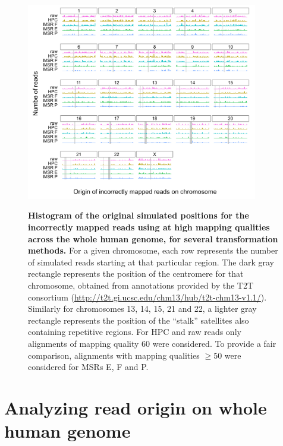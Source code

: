\documentclass[
  11pt,
  twoside]{scrbook}
\newcommand{\extcaption}[2]{
    \caption[#1]{
        \textbf{#1}\newline
        #2
    }
}
\begin{document}
\begin{figure}[H]
    \centering
    \includegraphics[width=0.9\textwidth]{figures/HPC-MSRs/ridgelines.new_selection.pdf}\\
    \extcaption{Histogram of the original simulated positions for the incorrectly mapped reads using \minimap at high mapping qualities across the whole human genome, for several transformation methods.}{For a given chromosome, each row represents the number of simulated reads starting at that particular region. The dark gray rectangle represents the position of the centromere for that chromosome, obtained from annotations provided by the T2T consortium (\href{http://t2t.gi.ucsc.edu/chm13/hub/t2t-chm13-v1.1/}{http://t2t.gi.ucsc.edu/chm13/hub/t2t-chm13-v1.1/}). Similarly for chromosomes 13, 14, 15, 21 and 22, a lighter gray rectangle represents the position of the ``stalk'' satellites also containing repetitive regions. For HPC and raw reads only alignments of mapping quality 60 were considered. To provide a fair comparison, alignments with mapping qualities $\geq 50$ were considered for MSRs E, F and P.}
    \label{fig:error-hists}
\end{figure}

\hypertarget{analyzing-read-origin-on-whole-human-genome}{%
\section{Analyzing read origin on whole human genome}\label{analyzing-read-origin-on-whole-human-genome}}
\end{document}
